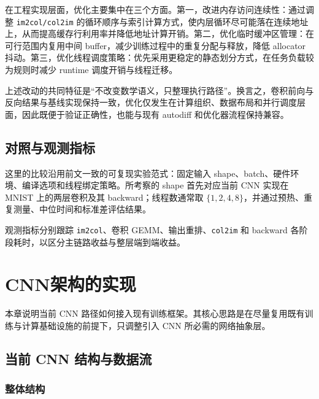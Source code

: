 \documentclass[a4paper,11pt,oneside]{article}
\begin{document}
在工程实现层面，优化主要集中在三个方面。第一，改进内存访问连续性：通过调整 \texttt{im2col/col2im} 的循环顺序与索引计算方式，使内层循环尽可能落在连续地址上，从而提高缓存行利用率并降低地址计算开销。第二，优化临时缓冲区管理：在可行范围内复用中间 buffer，减少训练过程中的重复分配与释放，降低 allocator 抖动。第三，优化线程调度策略：优先采用更稳定的静态划分方式，在任务负载较为规则时减少 runtime 调度开销与线程迁移。

上述改动的共同特征是“不改变数学语义，只整理执行路径”。换言之，卷积前向与反向结果与基线实现保持一致，优化仅发生在计算组织、数据布局和并行调度层面，因此既便于验证正确性，也能与现有 autodiff 和优化器流程保持兼容。

\subsection{对照与观测指标}

这里的比较沿用前文一致的可复现实验范式：固定输入 shape、batch、硬件环境、编译选项和线程绑定策略。所考察的 shape 首先对应当前 CNN 实现在 MNIST 上的两层卷积及其 backward；线程数通常取 $\{1,2,4,8\}$，并通过预热、重复测量、中位时间和标准差评估结果。

观测指标分别跟踪 \texttt{im2col}、卷积 GEMM、输出重排、\texttt{col2im} 和 backward 各阶段耗时，以区分主链路收益与整层端到端收益。

\section{CNN架构的实现}

本章说明当前 CNN 路径如何接入现有训练框架。其核心思路是在尽量复用既有训练与计算基础设施的前提下，只调整引入 CNN 所必需的网络抽象层。

\subsection{当前 CNN 结构与数据流}

\subsubsection{整体结构}
\end{document}
